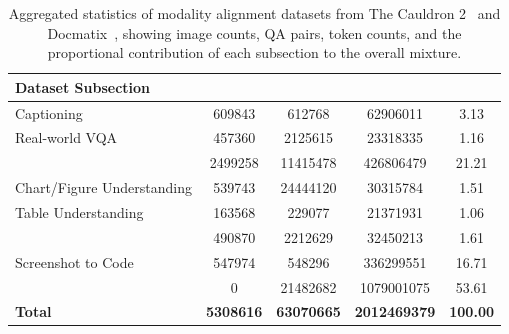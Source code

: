 \begin{table}[ht]
\centering
{}
\begin{tabular}{
    l
    S[table-format=7.0]
    S[table-format=8.0]
    S[table-format=10.0]
    S[table-format=3.2]
}
\toprule
\textbf{Dataset Subsection} & {\textbf{}} & {\textbf{}} & {\textbf{}} & {\textbf{}} \\
\midrule
Captioning & 609843 & 612768 & 62906011 & 3.13 \\
Real-world VQA & 457360 & 2125615 & 23318335 & 1.16 \\
 & 2499258 & 11415478 & 426806479 & 21.21 \\
Chart/Figure Understanding & 539743 & 24444120 & 30315784 & 1.51 \\
Table Understanding & 163568 & 229077 & 21371931 & 1.06 \\
 & 490870 & 2212629 & 32450213 & 1.61 \\
Screenshot to Code & 547974 & 548296 & 336299551 & 16.71 \\
 & 0 & 21482682 & 1079001075 & 53.61 \\
\midrule
\textbf{Total} & \textbf{5308616} & \textbf{63070665} & \textbf{2012469379} & \textbf{100.00} \\
\bottomrule
\end{tabular}
\caption{Aggregated statistics of modality alignment datasets from The Cauldron 2~\citep{laurençon2024mattersbuildingvisionlanguagemodels} and Docmatix~\citep{laurençon2024building}, showing image counts, QA pairs, token counts, and the proportional contribution of each subsection to the overall mixture.}
\label{tab:mod_alignment_mix}
\end{table}
